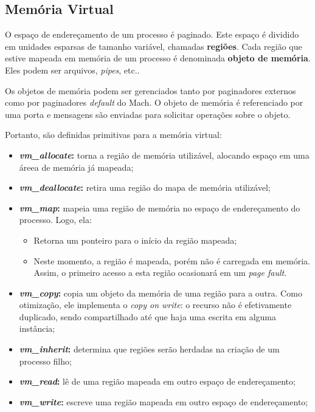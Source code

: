 \subsection{Memória Virtual}
O espaço de endereçamento de um processo é paginado. Este espaço é dividido em unidades esparsas de tamanho variável, chamadas \textbf{regiões}. Cada região que estive mapeada em memória de um processo é denominada \textbf{objeto de memória}. Eles podem ser arquivos, \textit{pipes}, etc..

Os objetos de memória podem ser gerenciados tanto por paginadores externos como por paginadores \textit{default} do Mach. O objeto de memória é referenciado por uma porta e mensagens são enviadas para solicitar operações sobre o objeto.

Portanto, são definidas primitivas para a memória virtual:
\begin{itemize}
  \item \textbf{\textit{vm\_allocate}:} torna a região de memória utilizável, alocando espaço em uma áreea de memória já mapeada;

  \item \textbf{\textit{vm\_deallocate}:} retira uma região do mapa de memória utilizável;

  \item \textbf{\textit{vm\_map}:} mapeia uma região de memória no espaço de endereçamento do processo. Logo, ela:
  \begin{itemize}
    \item Retorna um ponteiro para o início da região mapeada;

    \item Neste momento, a região é mapeada, porém não é carregada em memória. Assim, o primeiro acesso a esta região ocasionará em um \textit{page fault}.
  \end{itemize}

  \item \textbf{\textit{vm\_copy}:} copia um objeto da memória de uma região para a outra. Como otimização, ele implementa o \textit{copy on write}: o recurso não é efetivamente duplicado, sendo compartilhado até que haja uma escrita em alguma instância;

  \item \textbf{\textit{vm\_inherit}:} determina que regiões serão herdadas na criação de um processo filho;

  \item \textbf{\textit{vm\_read}:} lê de uma região mapeada em outro espaço de endereçamento;

  \item \textbf{\textit{vm\_write}:} escreve uma região mapeada em outro espaço de endereçamento;

\end{itemize}

